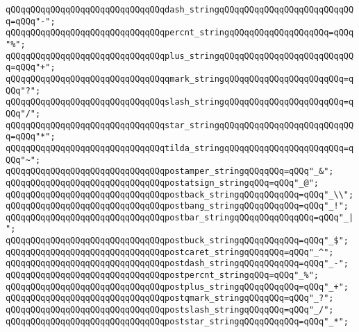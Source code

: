\verb|qQQqqQQqqQQqqQQqqQQqqQQqqQQqqQQqdash_stringqQQqqQQqqQQqqQQqqQQqqQQqqQQq=qQQq"-";|\newline
\verb|qQQqqQQqqQQqqQQqqQQqqQQqqQQqqQQqpercnt_stringqQQqqQQqqQQqqQQqqQQq=qQQq"%";|\newline
\verb|qQQqqQQqqQQqqQQqqQQqqQQqqQQqqQQqplus_stringqQQqqQQqqQQqqQQqqQQqqQQqqQQq=qQQq"+";|\newline
\verb|qQQqqQQqqQQqqQQqqQQqqQQqqQQqqQQqqmark_stringqQQqqQQqqQQqqQQqqQQqqQQq=qQQq"?";|\newline
\verb|qQQqqQQqqQQqqQQqqQQqqQQqqQQqqQQqslash_stringqQQqqQQqqQQqqQQqqQQqqQQq=qQQq"/";|\newline
\verb|qQQqqQQqqQQqqQQqqQQqqQQqqQQqqQQqstar_stringqQQqqQQqqQQqqQQqqQQqqQQqqQQq=qQQq"*";|\newline
\verb|qQQqqQQqqQQqqQQqqQQqqQQqqQQqqQQqtilda_stringqQQqqQQqqQQqqQQqqQQqqQQq=qQQq"~";|\newline
\newline
\verb|qQQqqQQqqQQqqQQqqQQqqQQqqQQqqQQqpostamper_stringqQQqqQQq=qQQq"_&";|\newline
\verb|qQQqqQQqqQQqqQQqqQQqqQQqqQQqqQQqpostatsign_stringqQQq=qQQq"_@";|\newline
\verb|qQQqqQQqqQQqqQQqqQQqqQQqqQQqqQQqpostback_stringqQQqqQQqqQQq=qQQq"_\\";|\newline
\verb|qQQqqQQqqQQqqQQqqQQqqQQqqQQqqQQqpostbang_stringqQQqqQQqqQQq=qQQq"_!";|\newline
\verb|qQQqqQQqqQQqqQQqqQQqqQQqqQQqqQQqpostbar_stringqQQqqQQqqQQqqQQq=qQQq"_|\verb#|";#\newline
\verb|qQQqqQQqqQQqqQQqqQQqqQQqqQQqqQQqpostbuck_stringqQQqqQQqqQQq=qQQq"_$";|\newline
\verb|qQQqqQQqqQQqqQQqqQQqqQQqqQQqqQQqpostcaret_stringqQQqqQQq=qQQq"_^";|\newline
\verb|qQQqqQQqqQQqqQQqqQQqqQQqqQQqqQQqpostdash_stringqQQqqQQqqQQq=qQQq"_-";|\newline
\verb|qQQqqQQqqQQqqQQqqQQqqQQqqQQqqQQqpostpercnt_stringqQQq=qQQq"_%";|\newline
\verb|qQQqqQQqqQQqqQQqqQQqqQQqqQQqqQQqpostplus_stringqQQqqQQqqQQq=qQQq"_+";|\newline
\verb|qQQqqQQqqQQqqQQqqQQqqQQqqQQqqQQqpostqmark_stringqQQqqQQq=qQQq"_?";|\newline
\verb|qQQqqQQqqQQqqQQqqQQqqQQqqQQqqQQqpostslash_stringqQQqqQQq=qQQq"_/";|\newline
\verb|qQQqqQQqqQQqqQQqqQQqqQQqqQQqqQQqpoststar_stringqQQqqQQqqQQq=qQQq"_*";|\newline
